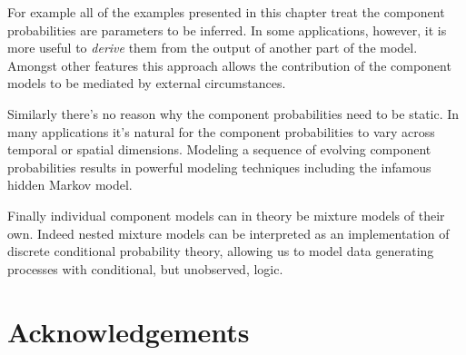 \documentclass[
  letterpaper,
  DIV=11,
  numbers=noendperiod]{scrartcl}
\begin{document}
For example all of the examples presented in this chapter treat the
component probabilities are parameters to be inferred. In some
applications, however, it is more useful to \emph{derive} them from the
output of another part of the model. Amongst other features this
approach allows the contribution of the component models to be mediated
by external circumstances.

Similarly there's no reason why the component probabilities need to be
static. In many applications it's natural for the component
probabilities to vary across temporal or spatial dimensions. Modeling a
sequence of evolving component probabilities results in powerful
modeling techniques including the infamous hidden Markov model.

Finally individual component models can in theory be mixture models of
their own. Indeed nested mixture models can be interpreted as an
implementation of discrete conditional probability theory, allowing us
to model data generating processes with conditional, but unobserved,
logic.

\section*{Acknowledgements}\label{acknowledgements}
\end{document}
